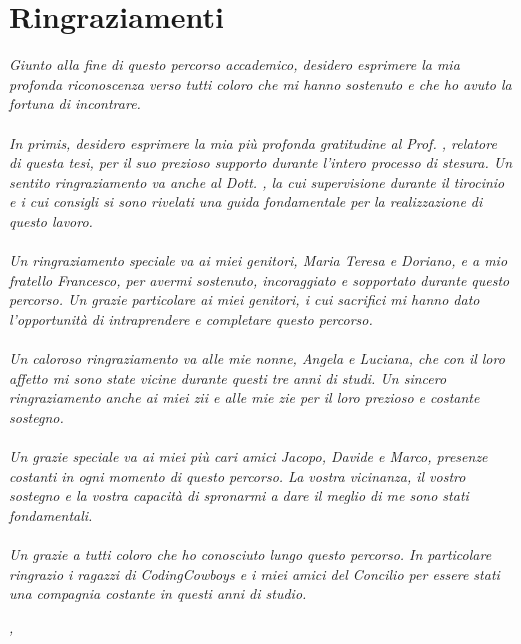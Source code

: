 \cleardoublepage
{}
{}

\bigskip

\begingroup
\let\clearpage\relax
\let\cleardoublepage\relax
\let\cleardoublepage\relax

\chapter*{Ringraziamenti}

\textit{Giunto alla fine di questo percorso accademico, desidero esprimere la mia profonda riconoscenza verso tutti coloro che mi hanno sostenuto e che ho avuto la fortuna di incontrare.}
\\\\
\noindent \textit{In primis, desidero esprimere la mia più profonda gratitudine al Prof. \myProf, relatore di questa tesi, per il suo prezioso supporto durante l'intero processo di stesura. Un sentito ringraziamento va anche al Dott. \myTutor, la cui supervisione durante il tirocinio e i cui consigli si sono rivelati una guida fondamentale per la realizzazione di questo lavoro.}
\\\\
\noindent \textit{Un ringraziamento speciale va ai miei genitori, Maria Teresa e Doriano, e a mio fratello Francesco, per avermi sostenuto, incoraggiato e sopportato durante questo percorso. 
Un grazie particolare ai miei genitori, i cui sacrifici mi hanno dato l'opportunità di intraprendere e completare questo percorso.}
\\\\
\noindent \textit{Un caloroso ringraziamento va alle mie nonne, Angela e Luciana, che con il loro affetto mi sono state vicine durante questi tre anni di studi. Un sincero ringraziamento anche ai miei zii e alle mie zie per il loro prezioso e costante sostegno.}
\\\\
\noindent \textit{Un grazie speciale va ai miei più cari amici Jacopo, Davide e Marco, presenze costanti in ogni momento di questo percorso. La vostra vicinanza, il vostro sostegno e la vostra capacità di spronarmi a dare il meglio di me sono stati fondamentali.}
\\\\
\noindent \textit{Un grazie a tutti coloro che ho conosciuto lungo questo percorso. In particolare ringrazio i ragazzi di CodingCowboys e i miei amici del Concilio per essere stati una compagnia costante in questi anni di studio.}
\bigskip

\noindent\textit{\myLocation, \myTime}
\hfill \myName 

\endgroup
